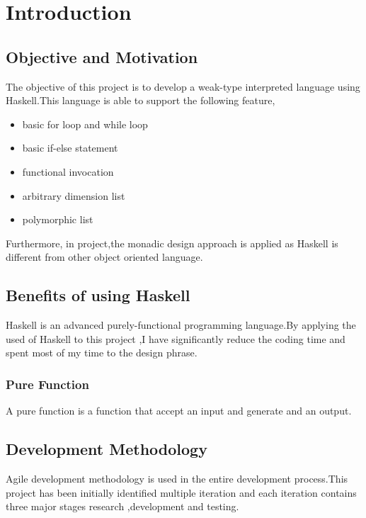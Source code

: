 \chapter{Introduction}
\section{Objective and Motivation}
The objective of this project is to develop a weak-type interpreted language using Haskell.This language is able to support the following feature,
\begin{itemize}
\item basic for loop and while loop
\item basic if-else statement
\item functional invocation 
\item arbitrary dimension list
\item polymorphic list
\end{itemize}

Furthermore, in project,the monadic design approach is applied as Haskell is different from other object oriented language.

\section{Benefits of using Haskell} 
Haskell is an advanced purely-functional programming language.By applying the used of Haskell to this project ,I have significantly reduce the coding time and spent most of my time to the design phrase.
\subsection{Pure Function}
A pure function is a function that accept an input and generate and an output.


\section{Development Methodology}
Agile development methodology is used in the entire development process.This project has been initially identified multiple iteration and each iteration contains three major stages research ,development and testing.